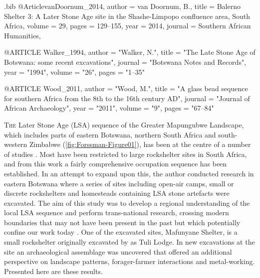 \begin{filecontents}{\IJSRAidentifier.bib}
@Article{vanDoornum_2014,
  author  = {{van Doornum}, B.},
  title   = {Balerno Shelter 3: A Later Stone Age site in the Shashe-Limpopo confluence area, South Africa},
  volume  = {29},
  pages   = {129--155},
  year    = {2014},
  journal = {Southern African Humanities},
}


@ARTICLE {Walker_1994,
author  = "Walker, N.",
title   = "The Late Stone Age of Botswana: some recent excavations",
journal = "Botswana Notes and Records",
year    = "1994",
volume  = "26",
pages   = "1--35"
}


@ARTICLE {Wood_2011,
author  = "Wood, M.",
title   = "A glass bead sequence for southern Africa from the 8th to the 16th century AD",
journal = "Journal of African Archaeology",
year    = "2011",
volume  = "9",
pages   = "67--84"
}
\end{filecontents}

%
\IJSRAopening

\lettrine{T}{he} Later Stone Age (LSA) sequence of the Greater Mapungubwe Landscape, which includes parts of eastern Botswana, northern South Africa and south-western Zimbabwe (\cref{fig:Forssman-Figure01}), has been at the centre of a number of studies \parencites[e.g.][]{Hall_2000,vanDoornum_2005,vanDoornum_2007,vanDoornum_2008,vanDoornum_2014,Forssman_2010,Forssman_2013a,Forssman_2013b,Forssman_2013c,Forssman_2014a,Forssman_2014b}. 
Most have been restricted to large rockshelter sites in South Africa, and from this work a fairly comprehensive occupation sequence has been established. In an attempt to expand upon this, the author conducted research in eastern Botswana where a series of sites including open-air camps, small or discrete rockshelters and homesteads containing LSA stone artefacts were excavated. The aim of this study was to develop a regional understanding of the local LSA sequence and perform trans-national research, crossing modern boundaries that may not have been present in the past but which potentially confine our work today \parencites[for details see][]{Forssman_2014a}{Forssman_2014b}{Forssman_2013c}{Forssman_2015}. One of the excavated sites, Mafunyane Shelter, is a small rockshelter originally excavated by \textcite{Walker_1994} as Tuli Lodge. 
In new excavations at the site an archaeological assemblage was uncovered that offered an additional perspective on landscape patterns, forager-farmer interactions and metal-working. Presented here are these results.
	
